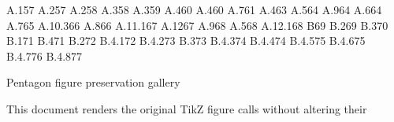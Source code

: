 \documentclass{amsart}
\def\tikzfig#1#2#3{%
\begin{figure}[htb]%
  \centering
\begin{tikzpicture}#3
\end{tikzpicture}
  \caption{#2}
  \label{fig:#1}%
\end{figure}%
}
\numberwithin{equation}{section}
\numberwithin{figure}{section}
\numberwithin{table}{section}
\theoremstyle{plain}
\theoremstyle{definition}
\theoremstyle{remark}
\begin{document}
\expandafter\def\csname r@eqn:sym\endcsname{{A.1}{57}}
\expandafter\def\csname r@sec:xalpha\endcsname{{A.2}{57}}
\expandafter\def\csname r@fig:extended\endcsname{{A.2}{58}}
\expandafter\def\csname r@sec:banana\endcsname{{A.3}{58}}
\expandafter\def\csname r@fig:banana2\endcsname{{A.3}{59}}
\expandafter\def\csname r@sec:pet\endcsname{{A.4}{60}}
\expandafter\def\csname r@fig:p-triangle\endcsname{{A.4}{60}}
\expandafter\def\csname r@sec:shared\endcsname{{A.7}{61}}
\expandafter\def\csname r@eqn:abc\endcsname{{A.4}{63}}
\expandafter\def\csname r@fig:cord-delta\endcsname{{A.5}{64}}
\expandafter\def\csname r@sec:pinwheel\endcsname{{A.9}{64}}
\expandafter\def\csname r@fig:cord-pinwheel\endcsname{{A.6}{64}}
\expandafter\def\csname r@fig:cord-L\endcsname{{A.7}{65}}
\expandafter\def\csname r@sec:one-ljx\endcsname{{A.10.3}{66}}
\expandafter\def\csname r@fig:cord-T\endcsname{{A.8}{66}}
\expandafter\def\csname r@sec:one-tjx\endcsname{{A.11.1}{67}}
\expandafter\def\csname r@sec:pint\endcsname{{A.12}{67}}
\expandafter\def\csname r@fig:cord-pint\endcsname{{A.9}{68}}
\expandafter\def\csname r@lemma:0605\endcsname{{A.5}{68}}
\expandafter\def\csname r@sec:one-pintx\endcsname{{A.12.1}{68}}
\expandafter\def\csname r@appendix:cc\endcsname{{B}{69}}
\expandafter\def\csname r@sec:auto-diff\endcsname{{B.2}{69}}
\expandafter\def\csname r@sec:mitm\endcsname{{B.3}{70}}
\expandafter\def\csname r@eqn:assembly\endcsname{{B.1}{71}}
\expandafter\def\csname r@sec:calc-prep\endcsname{{B.4}{71}}
\expandafter\def\csname r@lemma:peripheral-o2c\endcsname{{B.2}{72}}
\expandafter\def\csname r@sec:pseudo1\endcsname{{B.4.1}{72}}
\expandafter\def\csname r@sec:pseudo2\endcsname{{B.4.2}{73}}
\expandafter\def\csname r@eqn:pseudo2-constraint\endcsname{{B.3}{73}}
\expandafter\def\csname r@sec:pseudo-area\endcsname{{B.4.3}{74}}
\expandafter\def\csname r@sec:pseudo-area3\endcsname{{B.4.4}{74}}
\expandafter\def\csname r@sec:dimer-isosc\endcsname{{B.4.5}{75}}
\expandafter\def\csname r@sec:large\endcsname{{B.4.6}{75}}
\expandafter\def\csname r@sec:pent3\endcsname{{B.4.7}{76}}
\expandafter\def\csname r@sec:pent4\endcsname{{B.4.8}{77}}
\makeatother
\renewcommand{\thefigure}{\currentfigurenumber}
\def\tikzfig#1#2#3{\begin{figure}[p]\centering\begin{tikzpicture}#3\end{tikzpicture}\caption{#2}\end{figure}}
\begin{center}\Large Pentagon figure preservation gallery\end{center}
This document renders the original TikZ figure calls without altering their
\end{document}
